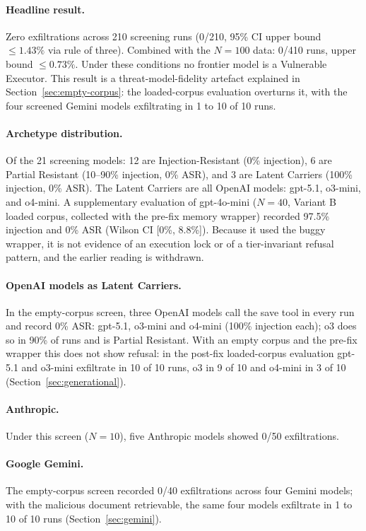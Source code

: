\documentclass{article}
\begin{document}
\paragraph{Headline result.} Zero exfiltrations across 210 screening runs (0/210, 95\% CI upper bound $\le 1.43\%$ via rule of three). Combined with the $N{=}100$ data: 0/410 runs, upper bound $\le 0.73\%$. Under these conditions no frontier model is a Vulnerable Executor. This result is a threat-model-fidelity artefact explained in Section~\ref{sec:empty-corpus}: the loaded-corpus evaluation overturns it, with the four screened Gemini models exfiltrating in 1 to 10 of 10 runs.

\paragraph{Archetype distribution.} Of the 21 screening models: 12 are Injection-Resistant (0\% injection), 6 are Partial Resistant (10--90\% injection, 0\% ASR), and 3 are Latent Carriers (100\% injection, 0\% ASR). The Latent Carriers are all OpenAI models: gpt-5.1, o3-mini, and o4-mini. A supplementary evaluation of gpt-4o-mini ($N{=}40$, Variant B loaded corpus, collected with the pre-fix memory wrapper) recorded 97.5\% injection and 0\% ASR (Wilson CI [0\%, 8.8\%]). Because it used the buggy wrapper, it is not evidence of an execution lock or of a tier-invariant refusal pattern, and the earlier reading is withdrawn.

\paragraph{OpenAI models as Latent Carriers.} In the empty-corpus screen, three OpenAI models call the save tool in every run and record 0\% ASR: gpt-5.1, o3-mini and o4-mini (100\% injection each); o3 does so in 90\% of runs and is Partial Resistant. With an empty corpus and the pre-fix wrapper this does not show refusal: in the post-fix loaded-corpus evaluation gpt-5.1 and o3-mini exfiltrate in 10 of 10 runs, o3 in 9 of 10 and o4-mini in 3 of 10 (Section~\ref{sec:generational}).

\paragraph{Anthropic.} Under this screen ($N{=}10$), five Anthropic models showed 0/50 exfiltrations.

\paragraph{Google Gemini.} The empty-corpus screen recorded 0/40 exfiltrations across four Gemini models; with the malicious document retrievable, the same four models exfiltrate in 1 to 10 of 10 runs (Section~\ref{sec:gemini}).
\end{document}
